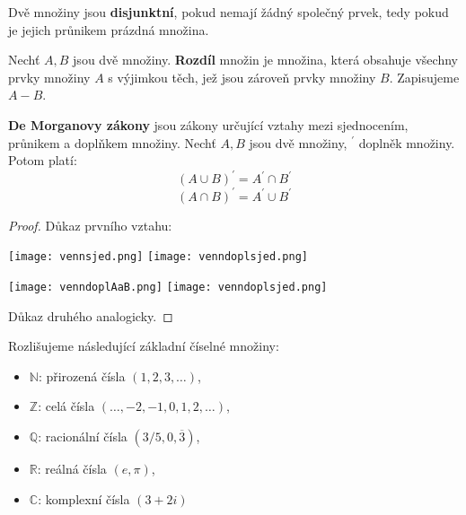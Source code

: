 \begin{definition}
  Dvě množiny jsou \textbf{disjunktní}, pokud nemají žádný společný prvek, tedy pokud je jejich průnikem prázdná množina.
\end{definition}

\begin{definition}
  Nechť $A, B$ jsou dvě množiny. \textbf{Rozdíl} množin je množina, která obsahuje všechny prvky množiny $A$ s výjimkou těch, jež jsou zároveň prvky množiny $B$. Zapisujeme $A - B$.
\end{definition}

\begin{veta}
  \textbf{De Morganovy zákony} jsou zákony určující vztahy mezi sjednocením, průnikem a doplňkem množiny. Nechť $A, B$ jsou dvě množiny, $^\prime$ doplněk množiny. Potom platí:
  $$ (A \cup B)^\prime = A^\prime \cap B^\prime$$
  $$ (A \cap B)^\prime = A^\prime \cup B^\prime$$
\end{veta}

\begin{proof}
  Důkaz prvního vztahu:

  \begin{minipage}{0.5\textwidth}
    \centering
        \texttt{[image: vennsjed.png]}
        \texttt{[image: venndoplsjed.png]}
  \end{minipage}
  \hfill
  \noindent\begin{minipage}{0.5\textwidth}
  \centering
        \texttt{[image: venndoplAaB.png]}
        \texttt{[image: venndoplsjed.png]}
  \end{minipage}

  Důkaz druhého analogicky.
\end{proof}

\begin{pozn}
  Rozlišujeme následující základní číselné množiny:
  \begin{itemize}
    \item $\mathbb{N}$: přirozená čísla $(1, 2, 3, \dots)$,
    \item $\mathbb{Z}$: celá čísla $(\dots, -2, -1, 0, 1, 2, \dots)$,
    \item $\mathbb{Q}$: racionální čísla $(3/5, 0,\overline{3})$,
    \item $\mathbb{R}$: reálná čísla $(e, \pi)$,
    \item $\mathbb{C}$: komplexní čísla $(3+2i)$
  \end{itemize}
\end{pozn}

